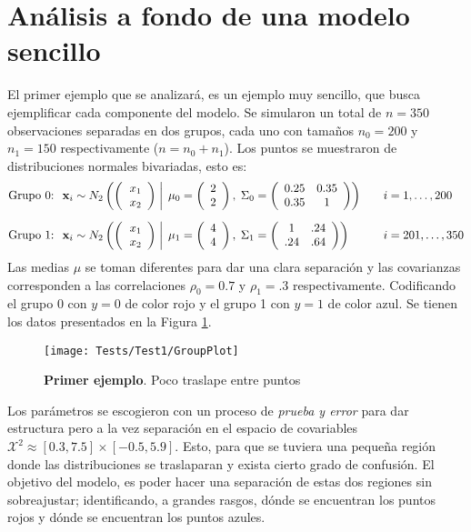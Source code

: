 \documentclass[../Main/Main.tex]{subfiles}
\begin{document}
\section{Análisis a fondo de una modelo sencillo} \label{ej:Test1}
El primer ejemplo que se analizará, es un ejemplo muy sencillo, que busca ejemplificar cada componente del modelo. Se simularon un total de $n = 350$ observaciones separadas en dos grupos, cada uno con tamaños $n_{0} = 200$ y  $n_{1} = 150$ respectivamente ($n = n_0 + n_1$). Los puntos se muestraron de distribuciones normales bivariadas, esto es:
\begin{align*}
\text{Grupo 0: } \;
&\xsn_i \sim \normbivar{2}{2}{0.25}{0.35}{1}{0} \quad
& &i = 1,\ldots,200 \\[6pt]
\text{Grupo 1: } \;
&\xsn_i \sim \normbivar{4}{4}{1}{.24}{.64}{1} \quad
& &i = 201,\ldots,350
\end{align*}
Las medias $\mu$ se toman diferentes para dar una clara separación y las covarianzas corresponden a las correlaciones $\rho_0 = 0.7$ y $\rho_1 = .3$ respectivamente. Codificando el grupo 0 con $y = 0$ de color rojo y el grupo 1 con $y = 1$ de color azul. Se tienen los datos presentados en la Figura \ref{fig:Test1Plot}.
\begin{figure}[h]
  \centering
      \texttt{[image: Tests/Test1/GroupPlot]}
  \caption{\textbf{Primer ejemplo}. Poco traslape entre puntos}
 \label{fig:Test1Plot}
\end{figure}
Los parámetros se escogieron con un proceso de \textit{prueba y error} para dar estructura pero a la vez separación en el espacio de covariables $\mathcal{X}^2 \approx [0.3,7.5]\times[-0.5,5.9]$. Esto, para que se tuviera una pequeña región donde las distribuciones se traslaparan y exista cierto grado de confusión. El objetivo del modelo, es poder hacer una separación de estas dos regiones sin sobreajustar; identificando, a grandes rasgos, dónde se encuentran los puntos rojos y dónde se encuentran los puntos azules.\\
\end{document}
